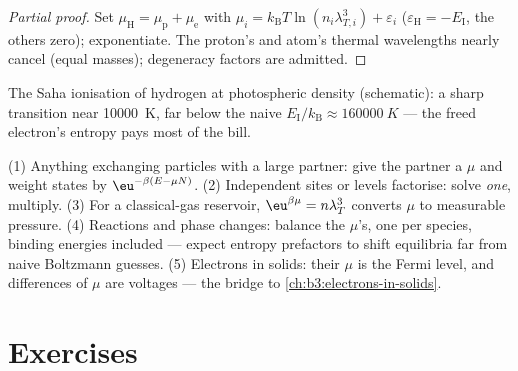 \begin{proof}[Partial proof]
Set $\mu_{\text{H}} = \mu_{\text{p}} + \mu_{\text{e}}$ with $\mu_i
= k_{\text{B}}T\ln(n_i\lambda_{T,i}^3) + \varepsilon_i$
($\varepsilon_{\text{H}} = -E_{\text{I}}$, the others zero);
exponentiate. The proton's and atom's thermal wavelengths nearly
cancel (equal masses); degeneracy factors are admitted.
\end{proof}

\begin{omfigure}

{\small The Saha ionisation of hydrogen at photospheric density
(schematic): a sharp transition near \qty{10000}{K}, far below the
naive $E_{\text{I}}/k_{\text{B}} \approx \qty{160000}{K}$ --- the
freed electron's entropy pays most of the bill.}
\end{omfigure}

\begin{method}\label{met:b3:grand-canonical:method}
(1) Anything exchanging particles with a large partner: give the
partner a $\mu$ and weight states by $\eu^{-\beta(E - \mu N)}$.
(2) Independent sites or levels factorise: solve \emph{one},
multiply. (3) For a classical-gas reservoir, $\eu^{\beta\mu} =
n\lambda_T^3$ converts $\mu$ to measurable pressure. (4) Reactions
and phase changes: balance the $\mu$'s, one per species, binding
energies included --- expect entropy prefactors to shift
equilibria far from naive Boltzmann guesses. (5) Electrons in
solids: their $\mu$ is the Fermi level, and differences of $\mu$
are voltages --- the bridge to
\cref{ch:b3:electrons-in-solids}.
\end{method}

\section{Exercises}

